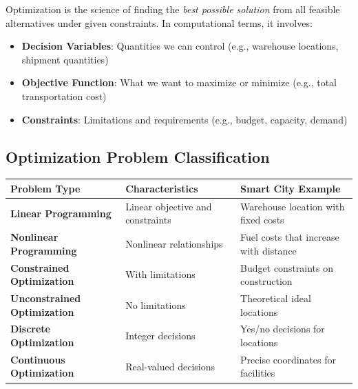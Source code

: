 \documentclass[
  letterpaper,
  DIV=11,
  numbers=noendperiod]{scrreprt}
\providecommand{\tightlist}{%
  \setlength{\itemsep}{0pt}\setlength{\parskip}{0pt}}
\begin{document}
Optimization is the science of finding the \emph{best possible solution}
from all feasible alternatives under given constraints. In computational
terms, it involves:

\begin{itemize}
\tightlist
\item
  \textbf{Decision Variables}: Quantities we can control (e.g.,
  warehouse locations, shipment quantities)
\item
  \textbf{Objective Function}: What we want to maximize or minimize
  (e.g., total transportation cost)
\item
  \textbf{Constraints}: Limitations and requirements (e.g., budget,
  capacity, demand)
\end{itemize}

\subsection{Optimization Problem
Classification}\label{optimization-problem-classification}

\begin{longtable}[]{@{}
  >{\raggedright\arraybackslash}p{}
  >{\raggedright\arraybackslash}p{}
  >{\raggedright\arraybackslash}p{}@{}}
\toprule\noalign{}
\begin{minipage}[b]{\linewidth}\raggedright
Problem Type
\end{minipage} & \begin{minipage}[b]{\linewidth}\raggedright
Characteristics
\end{minipage} & \begin{minipage}[b]{\linewidth}\raggedright
Smart City Example
\end{minipage} \\
\midrule\noalign{}
\endhead
\bottomrule\noalign{}
\endlastfoot
\textbf{Linear Programming} & Linear objective and constraints &
Warehouse location with fixed costs \\
\textbf{Nonlinear Programming} & Nonlinear relationships & Fuel costs
that increase with distance \\
\textbf{Constrained Optimization} & With limitations & Budget
constraints on construction \\
\textbf{Unconstrained Optimization} & No limitations & Theoretical ideal
locations \\
\textbf{Discrete Optimization} & Integer decisions & Yes/no decisions
for locations \\
\textbf{Continuous Optimization} & Real-valued decisions & Precise
coordinates for facilities \\
\end{longtable}
\end{document}
